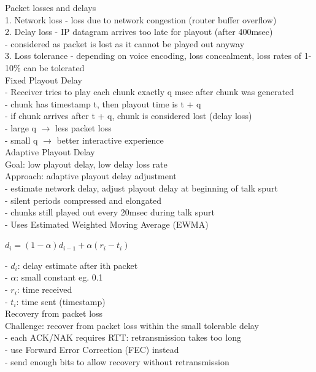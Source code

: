 \documentclass[10pt, a4paper]{article}
\newcommand{\blue}[1]{{\color{MidnightBlue}#1}}
\newcommand{\red}[1]{{\color{red}#1}}
\newcommand{\green}[1]{{\color{ForestGreen}#1}}
\newcommand{\tab}[0]{\hspace*{2mm}}
\begin{document}
\begin{multicols*}{3}
		Packet losses and delays\\
		1. \red{Network loss} - loss due to network congestion (router buffer overflow)\\
		2. \red{Delay loss} - IP datagram arrives \red{too late} for playout (after 400msec)\\
		\tab - considered as packet is lost as it cannot be played out anyway\\
		3. \red{Loss tolerance} - depending on \blue{voice encoding}, \blue{loss concealment}, loss rates of 1-10\% can be tolerated\\

		Fixed Playout Delay\\
		- Receiver tries to play each chunk exactly \blue{q} msec after chunk \red{was generated}\\
		\tab - chunk has timestamp \blue{t}, then playout time is \blue{t + q}\\
		\tab - if chunk arrives \red{after} \blue{t + q}, chunk is considered lost (delay loss)\\
		- \blue{large q} $\rightarrow$ less packet loss\\
		- \blue{small q} $\rightarrow$ better interactive experience\\

		Adaptive Playout Delay\\
		\red{Goal}: low playout delay, low delay loss rate\\
		\green{Approach}: adaptive playout delay adjustment\\
		\tab - estimate network delay, adjust playout delay at beginning of talk spurt\\
		\tab - silent periods compressed and elongated\\
		\tab - chunks still played out every 20msec during talk spurt\\
		- Uses Estimated Weighted Moving Average (EWMA)\\
		\centerline{$d_{i} = (1-\alpha)d_{i - 1} + \alpha(r_{i} - t_{i})$}
		- $d_{i}$: delay estimate after ith packet\\
		- $\alpha$: small constant eg. 0.1\\
		- $r_{i}$: time received\\
		- $t_{i}$: time sent (timestamp)\\

		Recovery from packet loss\\
		\red{Challenge}: recover from packet loss within the \red{small tolerable delay}\\
		- each ACK/NAK requires RTT: retransmission takes too long\\
		- use Forward Error Correction (FEC) instead\\
		\tab - send enough bits to allow recovery without retransmission\\


\end{multicols*}
\end{document}
